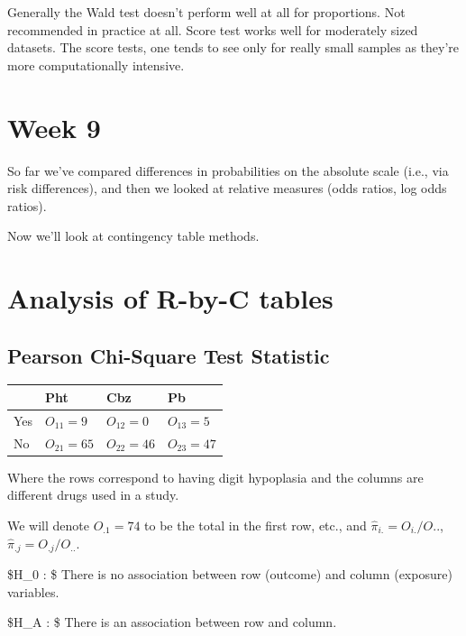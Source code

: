 \documentclass[
  letterpaper,
  DIV=11,
  numbers=noendperiod]{scrreport}
\begin{document}
Generally the Wald test doesn't perform well at all for proportions. Not
recommended in practice at all. Score test works well for moderately
sized datasets. The score tests, one tends to see only for really small
samples as they're more computationally intensive.


\hypertarget{week-9}{%
\chapter{Week 9}\label{week-9}}

So far we've compared differences in probabilities on the absolute scale
(i.e., via risk differences), and then we looked at relative measures
(odds ratios, log odds ratios).

Now we'll look at contingency table methods.


\hypertarget{analysis-of-r-by-c-tables}{%
\chapter{Analysis of R-by-C tables}\label{analysis-of-r-by-c-tables}}

\hypertarget{pearson-chi-square-test-statistic}{%
\section{Pearson Chi-Square Test
Statistic}\label{pearson-chi-square-test-statistic}}

\begin{longtable}[]{@{}llll@{}}
\toprule()
& Pht & Cbz & Pb \\
\midrule()
\endhead
Yes & \(O_{11} = 9\) & \(O_{12} = 0\) & \(O_{13} = 5\) \\
No & \(O_{21} = 65\) & \(O_{22} = 46\) & \(O_{23} = 47\) \\
\bottomrule()
\end{longtable}

Where the rows correspond to having digit hypoplasia and the columns are
different drugs used in a study.

We will denote \(O_{.1} = 74\) to be the total in the first row, etc.,
and \(\hat \pi_{i.} = O_{i.}/O{..}\), \(\hat \pi_{.j} = O_{.j}/O_{..}\).

\$H\_0 : \$ There is no association between row (outcome) and column
(exposure) variables.

\$H\_A : \$ There is an association between row and column.
\end{document}
